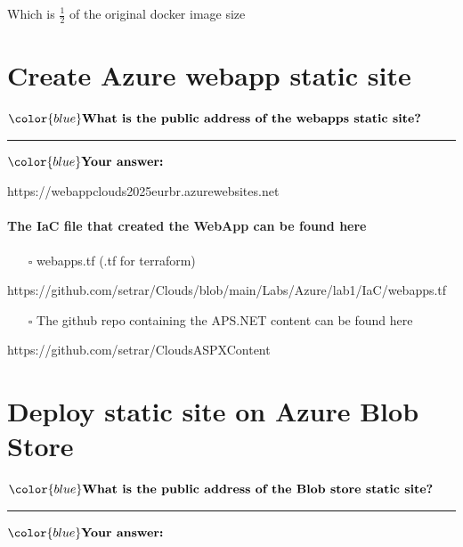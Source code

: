 \documentclass[11pt]{article}
\providecommand{\tightlist}{%
      \setlength{\itemsep}{0pt}\setlength{\parskip}{0pt}}
\begin{document}
Which is \(\frac{1}{2}\) of the original docker image size

    \section{Create Azure webapp static
site}\label{create-azure-webapp-static-site}

    \(\color{blue}\textbf{What is the public address of the webapps static site?}\)

\begin{center}\rule{0.5\linewidth}{0.5pt}\end{center}

\(\color{blue} \textbf{Your answer:}\)

https://webappclouds2025eurbr.azurewebsites.net

\paragraph{The IaC file that created the WebApp can be found
here}\label{the-iac-file-that-created-the-webapp-can-be-found-here}

\begin{itemize}
\tightlist
\item[$\square$]
  webapps.tf (.tf for terraform)
\end{itemize}

https://github.com/setrar/Clouds/blob/main/Labs/Azure/lab1/IaC/webapps.tf

\begin{itemize}
\tightlist
\item[$\square$]
  The github repo containing the APS.NET content can be found here
\end{itemize}

https://github.com/setrar/CloudsASPXContent

    \section{Deploy static site on Azure Blob
Store}\label{deploy-static-site-on-azure-blob-store}

    \(\color{blue}\textbf{What is the public address of the Blob store static site?}\)

\begin{center}\rule{0.5\linewidth}{0.5pt}\end{center}

\(\color{blue} \textbf{Your answer:}\)
\end{document}
